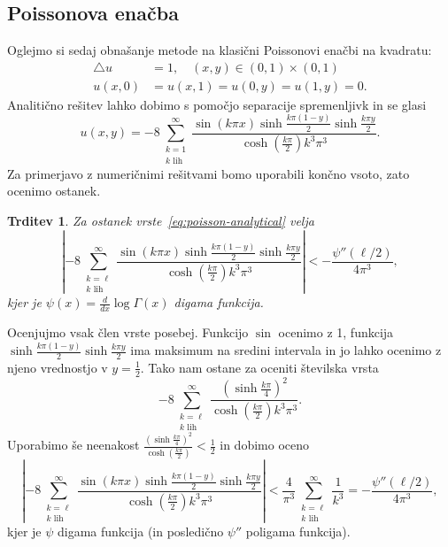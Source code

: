 \documentclass[a4paper,twoside]{article}
\theoremstyle{definition} %
\theoremstyle{plain} %
\newtheorem{trditev}[definicija]{Trditev}
\numberwithin{equation}{section}
\newcommand{\dd}[2]{\ensuremath{\frac{d #1}{d #2}}}
\newcommand{\ddx}[1]{\dd{#1}{x}}
\begin{document}
\subsection{Poissonova enačba}
Oglejmo si sedaj obnašanje metode na klasični Poissonovi enačbi na kvadratu:
\begin{align}
  \triangle u &= 1, \quad (x, y) \in (0, 1) \times (0, 1)
  \label{eq:poisson-problem} \\
  u(x, 0) &= u(x, 1) = u(0, y) = u(1, y) = 0. \nonumber
\end{align}
Analitično rešitev lahko dobimo s pomočjo separacije spremenljivk in se glasi
\begin{equation}
  u(x, y) =
  -8 \sum_{\substack{k=1 \\ k \text{ lih}}}^\infty \frac{ \sin (k \pi  x) \sinh
  \frac{k \pi  (1-y)}{2} \sinh \frac{k \pi
y}{2}}{\cosh(\frac{k\pi}{2})k^3 \pi ^3}.
  \label{eq:poisson-analytical}
\end{equation}
Za primerjavo z numeričnimi rešitvami bomo uporabili končno vsoto, zato ocenimo
ostanek.
\begin{trditev}
  Za ostanek vrste~\eqref{eq:poisson-analytical} velja
  \[
    \left|-8 \sum_{\substack{k=\ell \\ k \text{ lih}}}^\infty \frac{ \sin (k \pi  x) \sinh
      \frac{k \pi  (1-y)}{2} \sinh \frac{k \pi y}{2}}{\cosh(\frac{k\pi}{2})k^3
      \pi ^3}\right| < -\frac{\psi''(\ell/2)}{4 \pi^3},
  \]
  kjer je $\psi(x) = \ddx{}\log\Gamma(x)$ digama funkcija.
\end{trditev}
\proof
Ocenjujmo vsak člen vrste posebej. Funkcijo $\sin$ ocenimo z 1, funkcija
$\sinh \frac{k \pi  (1-y)}{2} \sinh \frac{k \pi y}{2}$ ima maksimum na sredini
intervala in jo lahko ocenimo z njeno vrednostjo v $y = \frac{1}{2}$.
Tako nam ostane za oceniti številska vrsta
\[
    -8 \sum_{\substack{k=\ell \\ k \text{ lih}}}^\infty
    \frac{\left(\sinh\frac{k \pi}{4}\right)^2}{\cosh(\frac{k\pi}{2})k^3
    \pi ^3} .
\]
Uporabimo še neenakost $\frac{\left(\sinh\frac{k
\pi}{4}\right)^2}{\cosh(\frac{k\pi}{2})} < \frac{1}{2}$ in dobimo oceno
\[
\left|-8 \sum_{\substack{k=\ell \\ k \text{ lih}}}^\infty \frac{ \sin (k \pi  x) \sinh
      \frac{k \pi  (1-y)}{2} \sinh \frac{k \pi y}{2}}{\cosh(\frac{k\pi}{2})k^3
      \pi ^3}\right| < \frac{4}{\pi^3} \sum_{\substack{k=\ell \\ k \text{ lih}}}^\infty
      \frac{1}{k^3} = -\frac{\psi''(\ell/2)}{4 \pi^3},
\]
kjer je $\psi$ digama funkcija (in posledično $\psi''$ poligama funkcija).
\end{document}
